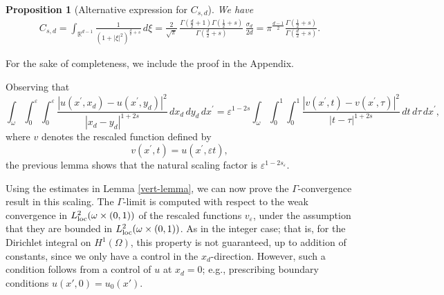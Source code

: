 \documentclass[11pt]{article}
\newtheorem{proposition}[definition]{Proposition}
\def\e{\varepsilon}
\begin{document}
\begin{proposition}[Alternative expression for $C_{s,d}$]\label{pro-Csd}
We have 
\begin{align}\label{csd-1}
C_{s,d}=\int_{\mathbb{R}^{d-1}}
\frac{1}{(1+|\xi|^2)^{\frac{d}{2}+s}}
\,d\xi=\frac{2}{\sqrt\pi} \,
\frac{\Gamma(\frac{d}{2}+1)\Gamma(\frac{1}{2}+s)}{\Gamma(\frac{d}{2}+s)}\, \frac{\sigma_d}{2d}=\pi^{\frac{d-1}{2}} \frac{\Gamma(\frac{1}{2}+s)}{\Gamma(\frac{d}{2}+s)}. 
\end{align}
\end{proposition}
\noindent For the sake of completeness, we include the proof in the Appendix.


\medskip
Observing that
\[
\int_\omega\int_0^\e\!\!\int_0^\e
\frac{|u(x^\prime,x_d)-u(x^\prime,y_d)|^2}{|x_d-y_d|^{1+2s}}
\, dx_d\, dy_d\, dx^\prime
=
\e^{1-2s}
\int_\omega\int_0^1\!\!\int_0^1
\frac{|v(x^\prime,t)-v(x^\prime,\tau)|^2}{|t-\tau|^{1+2s}}
\, dt\, d\tau\, dx^\prime,
\]
where $v$ denotes the rescaled function defined by 
\[
v(x^\prime,t)=u(x^\prime,\e t),
\]
the previous lemma shows that the natural scaling factor is $\e^{1-2s_\e}$. 

\smallskip
Using the estimates in Lemma \ref{vert-lemma}, we can now prove the $\Gamma$-convergence result in this scaling. The $\Gamma$-limit is computed with respect to the weak convergence in $L^2_{\rm loc}(\omega\times(0,1))$ of the rescaled functions $v_\e$, under the assumption that they are bounded in $L^2_{\rm loc}(\omega\times(0,1))$. As in the integer case; that is, for the Dirichlet integral on $H^1(\Omega)$, this property is not guaranteed, up to addition of constants, since we only have a control in the $x_d$-direction. However, such a condition follows from a control of $u$ at $x_d=0$; e.g., prescribing boundary conditions $u(x',0)=u_0(x')$.
\end{document}

